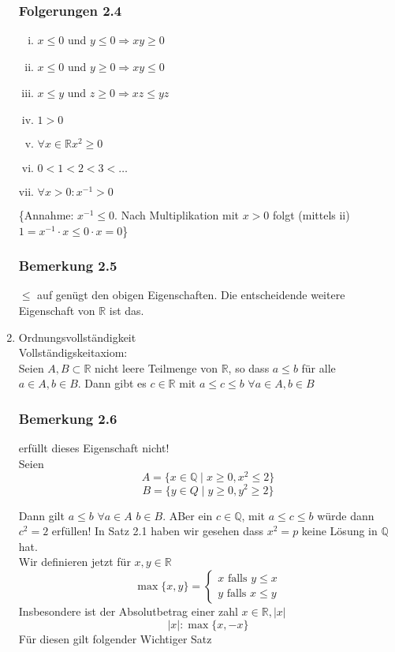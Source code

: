 \begin{enumerate}
\subsubsection*{Folgerungen 2.4}
\begin{enumerate}[i)]
\item $x\leq 0$ und $y\leq 0 \Rightarrow xy\geq 0$
\item $x\leq 0$ und $y\geq 0\Rightarrow xy\leq 0$
\item $x\leq y$ und $z\geq 0\Rightarrow xz\leq yz$
\item $1>0$
\item $\forall x\in\mathbb{R}$\hspace{10mm}$x^2\geq 0$
\item $0<1<2<3<\dots$
\item $\forall x>0: x^{-1}>0$
\end{enumerate}
\{Annahme: $x^{-1}\leq 0$. Nach Multiplikation mit $x>0$ folgt (mittels ii) $1=x^{-1}\cdot x\leq 0\cdot x=0$\}
\subsubsection*{Bemerkung 2.5}
$\leq$ auf  genügt den obigen Eigenschaften. Die entscheidende weitere Eigenschaft von $\mathbb{R}$ ist das.
\item Ordnungsvollständigkeit\\
Vollständigskeitaxiom:\\
Seien $A,B\subset\mathbb{R}$ nicht leere Teilmenge von $\mathbb{R}$, so dass $a\leq b$ für alle $a\in A,b\in B$. Dann gibt es $c\in\mathbb{R}$ mit $a\leq c\leq b$\hspace{5mm} $\forall a\in A,b\in B$
\subsubsection*{Bemerkung 2.6}
 erfüllt dieses Eigenschaft nicht!\\


Seien $$A=\{x\in\mathbb{Q}\mid x\geq 0, x^2\leq 2\}$$ $$B=\{y\in Q\mid y\geq 0, y^2 \geq 2\}$$ 

Dann gilt $a\leq b$ $\forall a\in A$ $b\in B$. ABer ein $c\in\mathbb{Q}$, mit $a\leq c\leq b$ würde dann $c^2=2$ erfüllen! In Satz 2.1 haben wir gesehen dass $x^2=p$ keine Lösung in $\mathbb{Q}$ hat. \\

Wir definieren jetzt für $x,y\in\mathbb{R}$ \[\max \{ x,y\}  = \left\{ {\begin{array}{*{20}{c}}
{x\text{ falls }y \le x}\\
{y\text{ falls }x \le y}
\end{array}} \right.\] Insbesondere ist der Absolutbetrag einer zahl $x\in\mathbb{R}, \left| x \right|$ $$\left| x \right|:\max \{x,-x\}$$ Für diesen gilt folgender Wichtiger Satz

\end{enumerate}
